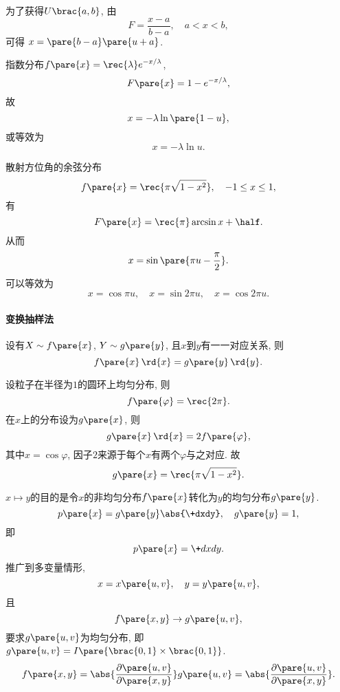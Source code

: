 \documentclass[hidelinks]{ctexart}
\begin{document}

\begin{sample}
    \begin{ex}
        为了获得$U\brac{a,b}$, 由
        \[ F = \frac{x-a}{b-a},\quad a<x<b, \]
        可得
        $x = \pare{b-a}\pare{u+a}$.
    \end{ex}
\end{sample}
\begin{sample}
    \begin{ex}
        指数分布$\displaystyle f\pare{x} = \rec{\lambda} e^{-x/\lambda}$,
        \[ F\pare{x} = 1-e^{-x/\lambda}, \]
        故
        \[ x = -\lambda \ln\pare{1-u}, \]
        或等效为
        \[ x = -\lambda \ln {u}. \]
    \end{ex}
\end{sample}
\begin{sample}
    \begin{ex}
        散射方位角的余弦分布
        \[ f\pare{x} = \rec{\pi \sqrt{1-x^2}},\quad -1\le x\le 1, \]
        有
        \[ F\pare{x} = \rec{\pi} \arcsin x + \half. \]
        从而
        \[ x = \sin \pare{\pi u - \frac{\pi}{2}}. \]
        可以等效为
        \[ x = \cos \pi u,\quad x = \sin 2\pi u,\quad x = \cos 2\pi u. \]
    \end{ex}
\end{sample}

\paragraph{变换抽样法} %
\label{par:变换抽样法}

设有$X\sim f\pare{x}$, $Y\sim g\pare{y}$, 且$x$到$y$有一一对应关系, 则
\[ f\pare{x}\,\rd{x} = g\pare{y}\,\rd{y}. \]
\begin{sample}
    \begin{ex}
        设粒子在半径为$1$的圆环上均匀分布, 则
        \[ f\pare{\varphi} = \rec{2\pi}. \]
        在$x$上的分布设为$g\pare{x}$, 则
        \[ g\pare{x}\,\rd{x} = 2f\pare{\varphi}, \]
        其中$x = \cos\varphi$, 因子$2$来源于每个$x$有两个$\varphi$与之对应. 故
        \[ g\pare{x} = \rec{\pi \sqrt{1-x^2}}. \]
    \end{ex}
\end{sample}
$x\mapsto y$的目的是令$x$的非均匀分布$f\pare{x}$转化为$y$的均匀分布$g\pare{y}$.
\[ p\pare{x} = g\pare{y}\abs{\+dxdy},\quad g\pare{y} = 1, \]
即
\[ p\pare{x} = \+dxdy. \]
推广到多变量情形,
\[ x = x\pare{u,v},\quad y = y\pare{u,v}, \]
且
\[ f\pare{x,y} \rightarrow g\pare{u,v}, \]
要求$g\pare{u,v}$为均匀分布, 即$g\pare{u,v} = I\pare{\brac{0,1}\times \brac{0,1}}$.
\[ f\pare{x,y} = \abs{\frac{\partial \pare{u,v}}{\partial \pare{x,y}}}g\pare{u,v} = \abs{\frac{\partial \pare{u,v}}{\partial \pare{x,y}}}. \]
\end{document}
